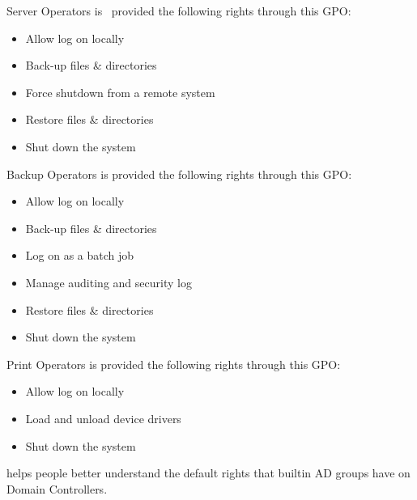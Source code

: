 Server Operators is  provided the following rights through this GPO:

\begin{itemize}
    \item Allow log on locally
    \item Back-up files \& directories
    \item Force shutdown from a remote system
    \item Restore files \& directories
    \item Shut down the system
\end{itemize}
Backup Operators is provided the following rights through this GPO:

\begin{itemize}
    \item Allow log on locally
    \item Back-up files \& directories
    \item Log on as a batch job
    \item Manage auditing and security log
    \item Restore files \& directories
    \item Shut down the system
\end{itemize}
 Print Operators is provided the following rights through this GPO:

\begin{itemize}
    \item Allow log on locally
    \item Load and unload device drivers
    \item Shut down the system
\end{itemize}
 helps people better understand the default rights that builtin AD groups have on Domain Controllers.

 